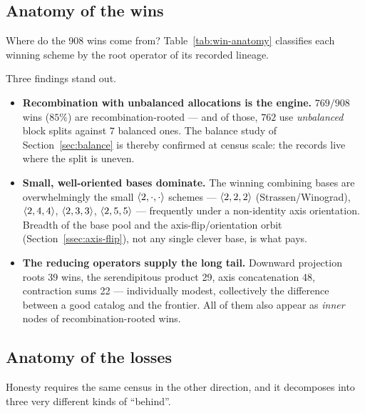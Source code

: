 \subsection{Anatomy of the wins}\label{ssec:win-anatomy}

Where do the 908 wins come from? Table~\ref{tab:win-anatomy} classifies
each winning scheme by the root operator of its recorded lineage.



Three findings stand out.
\begin{itemize}[itemsep=2pt]
  \item \textbf{Recombination with unbalanced allocations is the
    engine.} \(769/908\) wins (\(85\%\)) are recombination-rooted ---
    and of those, \(762\) use \emph{unbalanced} block splits against
    \(7\) balanced ones. The balance study of Section~\ref{sec:balance}
    is thereby confirmed at census scale: the records live where the
    split is uneven.
  \item \textbf{Small, well-oriented bases dominate.} The winning
    combining bases are overwhelmingly the small
    \(\langle 2, \cdot, \cdot \rangle\) schemes ---
    \(\langle 2, 2, 2 \rangle\) (Strassen/Winograd), \(\langle 2, 4, 4 \rangle\),
    \(\langle 2, 3, 3 \rangle\), \(\langle 2, 5, 5 \rangle\) --- frequently under
    a non-identity axis orientation. Breadth of the base pool and the
    axis-flip/orientation orbit (Section~\ref{ssec:axis-flip}), not any
    single clever base, is what pays.
  \item \textbf{The reducing operators supply the long tail.} Downward
    projection roots 39 wins, the serendipitous product 29, axis
    concatenation 48, contraction sums 22 --- individually modest,
    collectively the difference between a good catalog and the
    frontier. All of them also appear as \emph{inner} nodes of
    recombination-rooted wins.
\end{itemize}

\subsection{Anatomy of the losses}\label{ssec:losses}

Honesty requires the same census in the other direction, and it
decomposes into three very different kinds of ``behind''.

